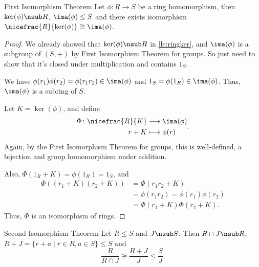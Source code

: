 \leavevmode
\begin{theorem}{First Isomorphism Theorem}{}
    Let \(\phi: R \to S\) be a ring homomorphism, then \(\ker(\phi) \nsub R\), \(\ima(\phi)\leq S\) and there exists isomorphism \(\nicefrac{R}{\ker(\phi)}\cong \ima(\phi)\).
\end{theorem}
\begin{proof}
    We already showed that \(\ker(\phi)\nsub R\) in \cref{le:ringker}, and \(\ima(\phi)\) is a subgroup of \((S,+)\) by First Isomorphism Theorem for groups. So just need to show that it's closed under multiplication and contains \(1_S\).

    We have \(\phi(r_1)\phi(r_2) = \phi(r_1 r_2)\in \ima(\phi)\) and \(1_S = \phi(1_R) \in \ima(\phi)\). Thus, \(\ima(\phi)\) is a subring of \(S\).

    Let \(K = \ker(\phi)\), and define
    \[
    \begin{aligned}
      \Phi\colon \nicefrac{R}{K} & \longrightarrow \ima(\phi)      \\
      r+K          & \longmapsto \phi(r)
    \end{aligned}.
    \]
    Again, by the First Isomorphism Theorem for groups, this is well-defined, a bijection and group homomorphism under addition.

    Also, \(\Phi(1_R + K) = \phi(1_R) = 1_S\), and
    \begin{align*}
        \Phi((r_{1}+K)(r_2 + K)) &= \Phi(r_1 r_2 + K)\\
        &= \phi(r_{1} r_2) = \phi(r_1)\phi(r_2)\\
        &=\Phi(r_1 + K) \Phi(r_2 + K).
    \end{align*}
    Thus, \(\Phi\) is an isomorphism of rings.
\end{proof}
\begin{theorem}{Second Isomorphism Theorem}{}
    Let \(R\leq S\) and \(J \nsub S\). Then \(R \cap J \nsub R\), \(R + J = \{r + a \mid r \in R, a \in S\}\leq S\) and
    \[
        \frac{R}{R\cap J} \cong \frac{R + J}{J}\leq \frac{S}{J}.
    \]
\end{theorem}
